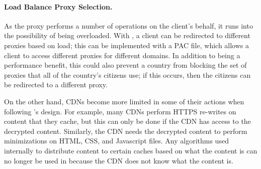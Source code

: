 \paragraph{Load Balance Proxy Selection.} As the proxy performs a number of operations on the client's behalf, it 
runs into the possibility of being overloaded.  With \system{}, a client can be redirected to different 
proxies based on load; this can be implemented with a PAC file, which allows 
a client to access different proxies for different domains.  In addition to being a performance benefit, 
this could also prevent a country from blocking the set of proxies that all of the country's citizens use; if 
this occurs, then the citizens can be redirected to a different proxy.   

On the other hand, CDNs become more limited in some of their actions when following \system{}'s design.  For example, 
many CDNs perform HTTPS re-writes on content that they cache, but this can only be done if the CDN has access to the 
decrypted content.  Similarly, the CDN needs the decrypted content to perform minimizations on HTML, CSS, and Javascript 
files.  Any algorithms used internally to distribute content to certain caches based on what the content is can no longer 
be used in \system{} because the CDN does not know what the content is. 
